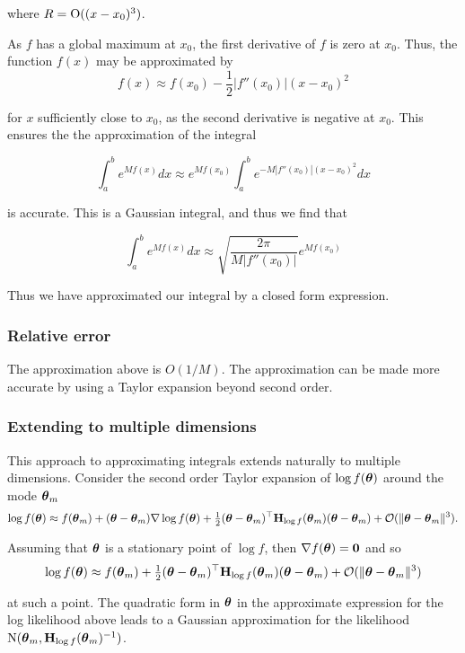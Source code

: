 \documentclass{amsart}[12pt]
\begin{document}
where $R = \text{O}((x - x_0)^3)$.

As $f$ has a global maximum at $x_0$, the first derivative of $f$ is zero at $x_0$. Thus, the function $f(x)$
may be approximated by
\[
	f(x) \approx f(x_0) - \frac{1}{2} |f''(x_0)| (x - x_0)^2
\]

for $x$ sufficiently close to $x_0$, as the second derivative is negative at $x_0$. This ensures the
the approximation of the integral

\[
	\int_a^b e^{M f(x)} dx \approx e^{M f(x_0)} \int_a^b e^{-M |f''(x_0)|(x - x_0)^2} dx
\]

is accurate. This is a Gaussian integral, and thus we find that

\[
	\int_a^b e^{M f(x)} dx \approx \sqrt{\frac{2 \pi}{M |f''(x_0)|}} e^{M f(x_0)}
\]

Thus we have approximated our integral by a closed form expression.

\subsubsection{Relative error} %
The approximation above is $O(1/M)$. %
The approximation can be made more accurate by using a Taylor
expansion beyond second order.

\subsubsection{Extending to multiple dimensions}
This approach to approximating integrals extends naturally to multiple dimensions.
Consider the second order Taylor expansion of $\log f({\boldsymbol \theta})$ around the mode ${\boldsymbol \theta}_m$
$$
\log f({\boldsymbol \theta}) \approx f({\boldsymbol \theta}_m) + ({\boldsymbol \theta} - {\boldsymbol \theta}_m) \nabla \log f({\boldsymbol \theta}) + \tfrac{1}{2} ({\boldsymbol \theta} - {\boldsymbol \theta}_m)^\top {\bf H}_{\log f}({\boldsymbol \theta}_m) ({\boldsymbol \theta} - {\boldsymbol \theta}_m) + {\mathcal O}(\|{\boldsymbol \theta} - {\boldsymbol \theta}_m\|^3).
$$

Assuming that ${\boldsymbol \theta}$ is a stationary point of $\log f$, then $\nabla f({\boldsymbol \theta}) = {\bf 0}$ and so
$$
\log f({\boldsymbol \theta}) \approx f({\boldsymbol \theta}_m) + \tfrac{1}{2} ({\boldsymbol \theta} - {\boldsymbol \theta}_m)^\top {\bf H}_{\log f}({\boldsymbol \theta}_m) ({\boldsymbol \theta} - {\boldsymbol \theta}_m) + {\mathcal O}(\|{\boldsymbol \theta} - {\boldsymbol \theta}_m\|^3)
$$

at such a point. The quadratic form in ${\boldsymbol \theta}$ in the approximate expression for the log likelihood above
leads to a Gaussian approximation for the likelihood $\text{N}({\boldsymbol \theta}_m, {\bf H}_{\log f}({\boldsymbol \theta}_m)^{-1})$.
\end{document}
